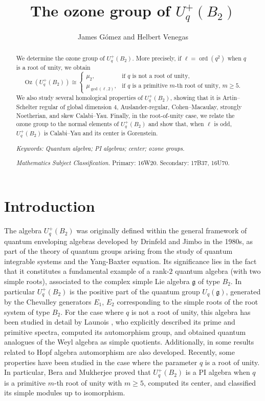 \documentclass[11pt]{article}
\title{\textbf{The ozone group of $U_q^+(B_2)$}}
\author{James Gómez and Helbert Venegas}
\date{}
\makeatletter
\theoremstyle{definition}
\def\@roman#1{\romannumeral #1}
\makeatother
\begin{document}
\makeatletter
\def\@roman#1{\romannumeral #1}
\makeatother
\maketitle
\begin{abstract}
\noindent
We determine the ozone group of \(U_q^{+}(B_2)\). More precisely, if
\(\ell=\operatorname{ord}(q^2)\) when \(q\) is a root of unity, we obtain
$$
\operatorname{Oz}(U_q^{+}(B_2))
\cong
\begin{cases}
\mu_2 , & \text{if \(q\) is not a root of unity},\\[2mm]
\mu_{\gcd(\ell,2)}, &
\text{if \(q\) is a primitive \(m\)-th root of unity, \(m\geq5\).}
\end{cases}
$$
We also study several homological properties of \(U_q^{+}(B_2)\), showing
that it is Artin--Schelter regular of global dimension \(4\), Auslander-regular, 
Cohen--Macaulay, strongly Noetherian, and skew Calabi--Yau. Finally, in
the root-of-unity case, we relate the ozone group to the normal elements
of \(U_q^{+}(B_2)\) and show that, when \(\ell\) is odd,
\(U_q^{+}(B_2)\) is Calabi--Yau and its center is Gorenstein.
 
\bigskip

\noindent
\textit{Keywords: Quantum algebra; PI algebras; center; ozone groups.} 
\bigskip

 \textit{Mathematics Subject Classification.} Primary: 16W20.
Secondary: 17B37, 16U70.
\end{abstract}
\section{Introduction}
The algebra \(U_q^{+}(B_2)\)  was originally defined within the general framework of quantum enveloping algebras developed by Drinfeld \cite{Drinfeld1986} and Jimbo \cite{Jimbo1985} in the 1980s, as part of the theory of quantum groups arising from the study of quantum integrable systems and the Yang-Baxter equation.
Its significance lies in the fact that it constitutes a fundamental example of a rank-$2$ quantum algebra (with two simple roots), associated to the complex simple Lie algebra $\mathfrak{g}$  of type $B_2$. In particular $U_q^{+}(B_2)$ is the positive part of the quantum group $U_q(\mathfrak{g})$, generated by the Chevalley generators $E_1$, $E_2$ corresponding to the simple roots of the root system of type $B_2$. For the case where \(q\) is not a root of unity, this algebra has been studied in detail by Launois \cite{Launois2007}, who explicitly described its prime and primitive spectra, computed its automorphism group, and obtained quantum analogues of the Weyl algebra as simple quotients. Additionally, in \cite{AndruskiewitschDumas2008} some results related to Hopf algebra automorphism are also developed. 
Recently, some properties have been studied in the case where the parameter $q$ is a root of unity. In particular, Bera and Mukherjee \cite{BeraMukherjee2026UqB2} proved that $U_q^{+}(B_2)$ is a PI algebra when $q$ is a primitive $m$-th root of unity with $m\geq 5$, computed its center, and classified its simple modules up to isomorphism. \\
\end{document}
